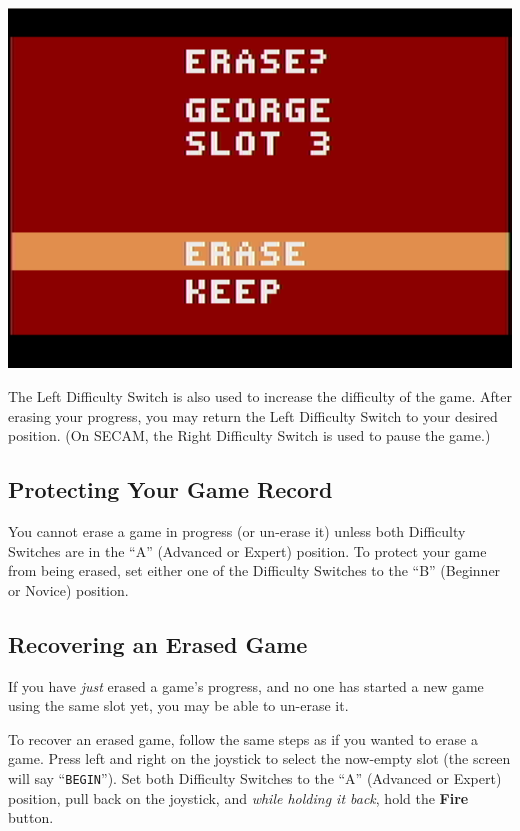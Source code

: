 \documentclass[10pt,twocolumn,openany,article]{memoir}
\begin{document}
\begin{center}
  \includegraphics[width=\columnwidth]{../Manual/ConfirmEraseNTSC.png}
\end{center}

\fi

The Left  Difficulty Switch is also  used to increase the  difficulty of
the  game.  After  erasing  your  progress,  you  may  return  the  Left
Difficulty  Switch  to  your  desired position.  (On  SECAM,  the  Right
Difficulty Switch is used to pause the game.)

\subsection{Protecting Your Game Record}

You  cannot erase  a  game  in progress  (or  un-erase  it) unless  both
Difficulty  Switches are  in the  ``A'' (Advanced  or Expert)  position.
To protect your game from being erased, set either one of the Difficulty
Switches to the ``B'' (Beginner or Novice) position.

\ifdefined\DEMO\else

\subsection{Recovering an Erased Game}

If you have \emph{just} erased a game's progress, and no one has started
a new game using the same slot yet, you may be able to un-erase it.

To recover  an erased game,  follow the same steps  as if you  wanted to
erase  a game.  Press  left and  right  on the  joystick  to select  the
now-empty  slot  (the  screen  will say  ``\texttt{BEGIN}'').  Set  both
Difficulty Switches  to the  ``A'' (Advanced  or Expert)  position, pull
back  on  the joystick,  and  \emph{while  holding  it back},  hold  the
\textbf{Fire} button.
\end{document}
